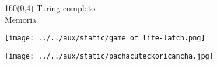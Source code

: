 \documentclass[shownotes,aspectratio=169]{beamer}
\begin{document}
\begin{frame}[plain]
\begin{textblock}{160}(0,4)
 \centering \LARGE
Turing completo \\ \Large Memoria
\end{textblock}
\vspace{1cm}
  
  \centering
\texttt{[image: ../../aux/static/game\_of\_life-latch.png]}


\end{frame}




% 
% 
% 



\begin{frame}[plain]
\centering
  \texttt{[image: ../../aux/static/pachacuteckoricancha.jpg]}
\end{frame}
\end{document}
